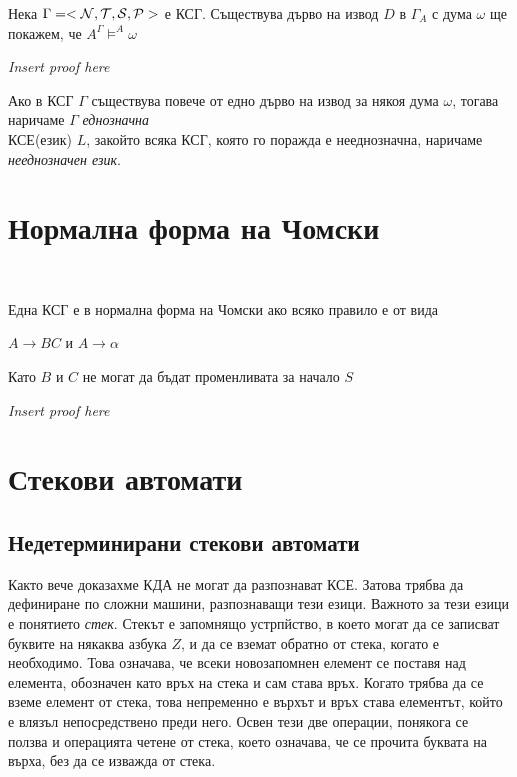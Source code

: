 \documentclass[11pt]{article} %
\begin{document}
{\theorem Нека $\Gamma = <\mathcal{N}, \mathcal{T}, \mathcal{S}, \mathcal{P}>$ е КСГ. Съществува дърво на извод $D$ в $\Gamma_{A}$ с дума $\omega$ ще покажем, че $A^{\Gamma} \models^{A} \omega$ \\
\centerline \emph{Insert proof here}

 Ако в КСГ $\Gamma$ съществува повече от едно дърво на извод за някоя дума $\omega$, тогава наричаме $\Gamma$ \emph{еднозначна} \\ 

 КСЕ(език) $L$, закойто всяка КСГ, която го поражда е нееднозначна, наричаме \emph{нееднозначен език}.

\section{Нормална форма на Чомски}

 \\ \par

 Една КСГ е в нормална форма на Чомски ако всяко правило е от вида \\
\centerline{$A \to BC$ и $A \to \alpha$}
Като $B$ и $C$ не могат да бъдат променливата за начало $S$\\ 
\centerline{\emph{Insert proof here}}



\section{Стекови автомати}
\subsection{Недетерминирани стекови автомати}
Както вече доказахме КДА не могат да разпознават КСЕ. Затова трябва да дефиниране по сложни машини, разпознаващи тези езици. Важното за тези езици е понятието \emph{стек}. Стекът е запомнящо устрпйство, в което могат да се записват буквите на някаква азбука $Z$, и да се вземат обратно от стека, когато е необходимо. Това означава, че всеки новозапомнен елемент се поставя над елемента, обозначен като връх на стека и сам става връх. Когато трябва да се вземе елемент от стека, това непременно е върхът и връх става елементът, който е влязъл непосредствено преди него. Освен тези две операции, понякога се ползва и операцията четене от стека, което означава, че се прочита буквата на върха, без да се изважда от стека. \par

}
\end{document}
